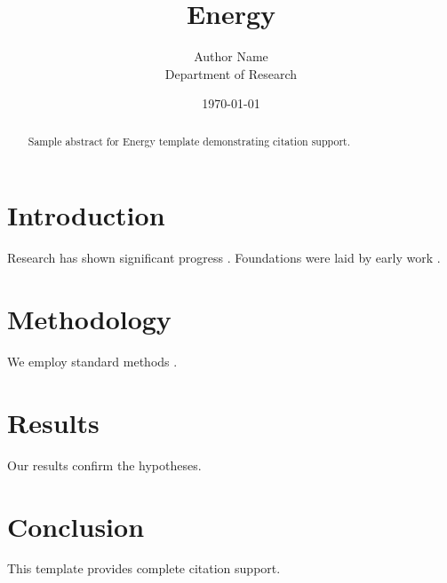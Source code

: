﻿\documentclass{elsarticle}
\title{Energy}
\author{Author Name \\ \small Department of Research}
\date{\today}
\begin{document}
\maketitle

\begin{abstract}
Sample abstract for Energy template demonstrating citation support.
\end{abstract}

\section{Introduction}
Research has shown significant progress \citep{einstein1905}. Foundations were laid by early work \citep{turing1950}.

\section{Methodology}
We employ standard methods \citep{knuth1984}.

\section{Results}
Our results confirm the hypotheses.

\section{Conclusion}
This template provides complete citation support.



\end{document}
